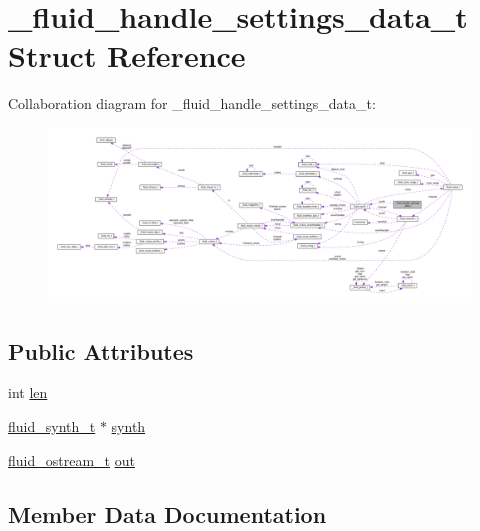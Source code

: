 \hypertarget{struct__fluid__handle__settings__data__t}{}\section{\+\_\+fluid\+\_\+handle\+\_\+settings\+\_\+data\+\_\+t Struct Reference}
\label{struct__fluid__handle__settings__data__t}


Collaboration diagram for \+\_\+fluid\+\_\+handle\+\_\+settings\+\_\+data\+\_\+t\+:
\nopagebreak
\begin{figure}[H]
\begin{center}
\leavevmode
\includegraphics[width=350pt]{struct__fluid__handle__settings__data__t__coll__graph}
\end{center}
\end{figure}
\subsection*{Public Attributes}
\begin{DoxyCompactItemize}
\item 
int \hyperlink{struct__fluid__handle__settings__data__t_a4653b8677c8c143d3412bb7370612a23}{len}
\item 
\hyperlink{types_8h_ae265f10ae174a13afe010de50d87e1a4}{fluid\+\_\+synth\+\_\+t} $\ast$ \hyperlink{struct__fluid__handle__settings__data__t_a0c301cc2b5d78e9725c490e5675b6212}{synth}
\item 
\hyperlink{types_8h_a6d8c441b84ab0430e358438cee876c69}{fluid\+\_\+ostream\+\_\+t} \hyperlink{struct__fluid__handle__settings__data__t_aba6fc20a71b263199ba78d30cbec30a0}{out}
\end{DoxyCompactItemize}


\subsection{Member Data Documentation}
\mbox{\label{struct__fluid__handle__settings__data__t_a4653b8677c8c143d3412bb7370612a23}} 
